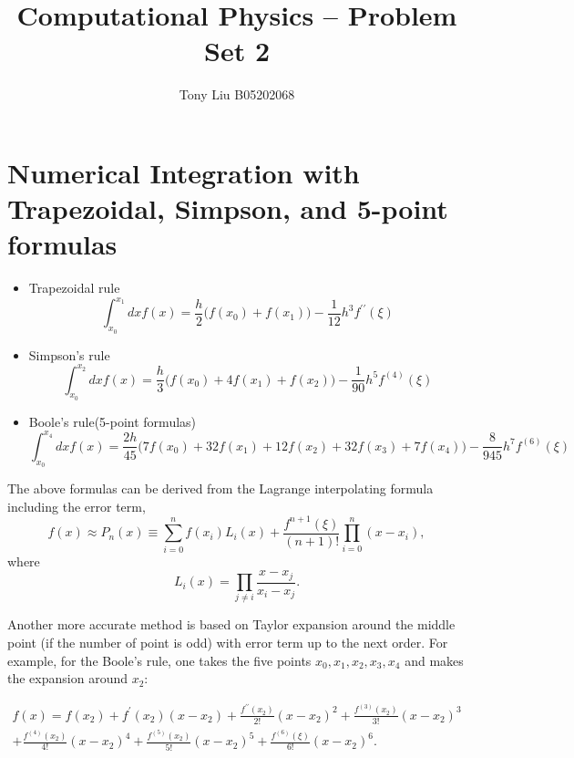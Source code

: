 \documentclass[11pt,a4paper]{article}
\title{Computational Physics -- Problem Set 2}
\author{Tony Liu B05202068}
\begin{document}
    
\maketitle

\section{Numerical Integration with Trapezoidal, Simpson, and 5-point formulas}%
\label{sec:numerical_integration_with_trapezoidal_simpson_and_5_point_formulas}

\begin{itemize}
    \item Trapezoidal rule\\
        $$ \int  _{x_0}^{x_1}dx f(x) = \frac{h}{2}\bigg(f(x_0) + f(x_1)\bigg) - \frac{1}{12}h^{3}f^{\prime \prime}(\xi)$$
    \item Simpson's rule\\
        $$  \int_{x_0}^{x_2}dx f(x) = \frac{h}{3}\bigg(f(x_0) + 4f(x_1) + f(x_2)\bigg) -\frac{1}{90}h^{5}f^{(4)}(\xi)$$

    \item Boole's rule(5-point formulas)\\
        $$  \int_{x_0}^{x_4}dx f(x) = \frac{2h}{45}\bigg(7f(x_0) + 32f(x_1) + 12f(x_2) + 32f(x_3) + 7f(x_4)\bigg) -\frac{8}{945}h^{7}f^{(6)}(\xi)$$

\end{itemize}
The above formulas can be derived from the Lagrange interpolating formula including the error term,
 \[
     f(x)\approx P_{n}(x) \equiv \sum _{i = 0}^{n}f(x_i)L_{i}(x)+\frac{f^{n+1}(\xi)}{(n+1)!}\prod_{i=0}^{n}(x-x_i)
,\]
where $$L_{i}(x) = \prod_{j \neq i}\frac{x-x_j}{x_i-x_j}.$$

Another more accurate method is based on Taylor expansion around the middle point (if the number of point is odd) with error term up to the next order. For example, for the Boole's rule, one takes the five points $x_0, x_1, x_2, x_3, x_4$ and makes the expansion around $x_2$:

\begin{multline*}
     f(x) = f(x_2) + f^{\prime}(x_2)(x-x_2)+\frac{f^{\prime \prime}(x_2)}{2!}(x-x_2)^{2} + \frac{f^{(3)}(x_2)}{3!}(x-x_2)^{3}\\
    + \frac{f^{(4)}(x_2)}{4!}(x-x_2)^{4} + \frac{f^{(5)}(x_2)}{5!}(x-x_2)^{5} + \frac{f^{(6)}(\xi)}{6!}(x-x_2)^{6}.
\end{multline*}
\end{document}
